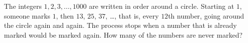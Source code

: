 The integers $1,2,3,\dots,1000$ are written in order around a circle. Starting at $1$, someone marks $1$, then $13$, $25$, $37$, \dots, that is, every $12$th number, going around the circle again and again. The process stops when a number that is already marked would be marked again. How many of the numbers are never marked?
